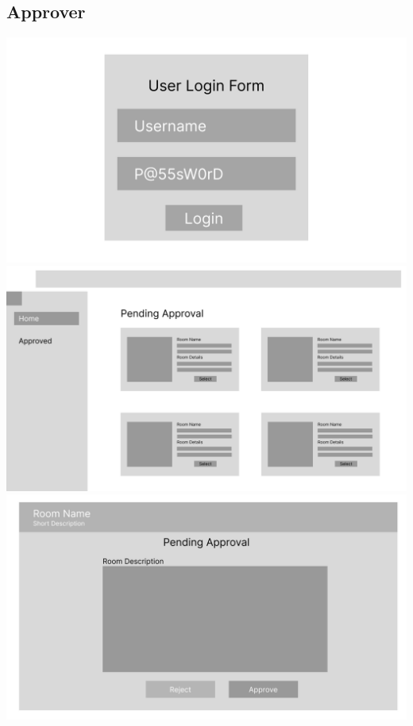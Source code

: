\documentclass[12pt,titlepage,a4paper]{report}
\begin{document}
    \subsection{Approver}
    \begin{center}
        \includegraphics[width=\textwidth]{images/figures/UIUX/Login_Page_(Atmin).png}\\
        \includegraphics[width=\textwidth]{images/figures/UIUX/Room_Borrowing_Page_(Dosenk).png}\\
        \includegraphics[width=\textwidth]{images/figures/UIUX/Pending_Approval_(Dosenk) 1.png}\\

\end{center}
\end{document}
